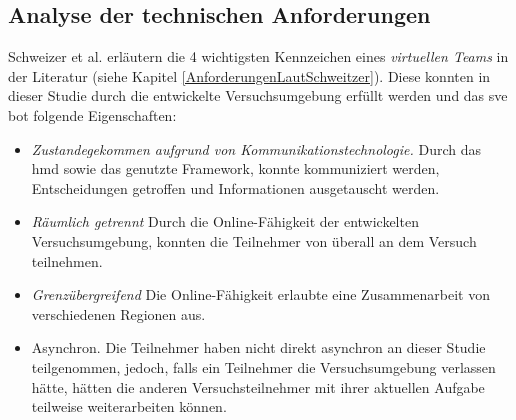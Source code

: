 \documentclass[a4paper,11pt]{article}%
\renewcommand{\\}{\vspace*{0.5\baselineskip} \newline}
\begin{document}
{{\subsection{Analyse der technischen Anforderungen}

Schweizer et al. \citep[S. 270]{schweitzer2010conceptualizing} erläutern die 4 wichtigsten Kennzeichen eines \textit{virtuellen Teams} in der Literatur (siehe Kapitel \ref{AnforderungenLautSchweitzer}). Diese konnten in dieser Studie durch die entwickelte Versuchsumgebung erfüllt werden und das \ac{sve} bot folgende Eigenschaften:
\begin{itemize}
\item \textit{Zustandegekommen aufgrund von Kommunikationstechnologie.} Durch das \ac{hmd} sowie das genutzte Framework, konnte kommuniziert werden, Entscheidungen getroffen und Informationen ausgetauscht werden.
\item \textit{Räumlich getrennt} Durch die Online-Fähigkeit der entwickelten Versuchsumgebung, konnten die Teilnehmer von überall an dem Versuch teilnehmen.
\item \textit{Grenzübergreifend} Die Online-Fähigkeit erlaubte eine Zusammenarbeit von verschiedenen Regionen aus.
\item Asynchron. Die Teilnehmer haben nicht direkt asynchron an dieser Studie teilgenommen, jedoch, falls ein Teilnehmer die Versuchsumgebung verlassen hätte, hätten die anderen Versuchsteilnehmer mit ihrer aktuellen Aufgabe teilweise weiterarbeiten können.
\end{itemize}

}}
\end{document}
